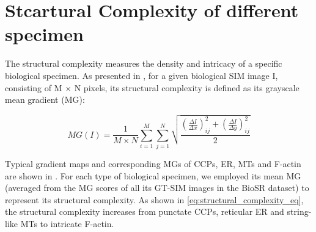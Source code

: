 \documentclass[11pt,
  paper=a4, 
  bibliography=totocnumbered,
	captions=tableheading,
	BCOR=10mm
]{scrreprt}
\theoremstyle{definition}
\begin{document}
\section{Stcartural Complexity of different specimen}
\label{sec:structural_complexity}

The structural complexity measures the density and 
intricacy of a specific biological specimen. As presented in \cite{DFCAN}, for a given biological SIM image I, 
consisting of M × N pixels, its structural complexity is defined as its grayscale mean 
gradient (MG):

\begin{equation}
\label{eq:structural_complexity_eq}
MG(I) = \frac{1}{M \times N} \sum_{i=1}^{M} \sum_{j=1}^{N} \sqrt{\frac{ \left( \frac{\Delta I}{\Delta x} \right)_{ij}^{2} + \left( \frac{\Delta I}{\Delta y} \right)_{ij}^{2}}{2}}
\end{equation}


\vspace{1cm}
\noindent
Typical gradient maps and corresponding MGs of CCPs, ER, MTs and F-actin 
are shown in \cite{rdl_main}. For each type of biological specimen, 
we employed its mean MG (averaged from the MG scores of all its GT-SIM 
images in the BioSR dataset) to represent its structural complexity. As shown in \eqref{eq:structural_complexity_eq}, the structural complexity increases from punctate CCPs, 
reticular ER and string-like MTs to intricate F-actin.
\end{document}
